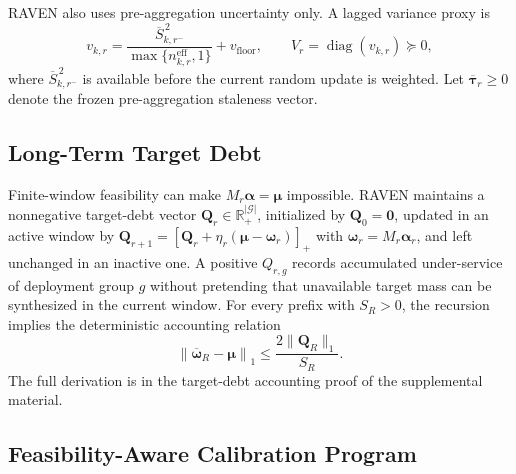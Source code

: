 \documentclass[letterpaper,journal]{IEEEtran}
\begin{document}
RAVEN also uses pre-aggregation uncertainty only.  A lagged variance proxy is
\begin{equation}
 v_{k,r}
 =
 \frac{
 \overline S_{k,r^-}^{\,2}
 }{
 \max\{n^{\mathrm{eff}}_{k,r},1\}
 }
 +
 v_{\mathrm{floor}},
 \qquad
 V_r=\operatorname{diag}(v_{k,r})\succeq0,
 \label{eq:variance_proxy}
\end{equation}
where $\overline S_{k,r^-}^{\,2}$ is available before the current random update
is weighted.  Let $\overline{\boldsymbol\tau}_r\ge0$ denote the frozen
pre-aggregation staleness vector.

\subsection{Long-Term Target Debt}
\label{subsec:debt}

Finite-window feasibility can make
$M_r\boldsymbol\alpha=\boldsymbol\mu$ impossible.  RAVEN maintains a
nonnegative target-debt vector
$\mathbf{Q}_r\in\mathbb{R}^{|\mathcal{G}|}_+$, initialized by
$\mathbf{Q}_0=\mathbf{0}$, updated in an active window by
$\mathbf{Q}_{r+1}=\left[\mathbf{Q}_r+\eta_r(\boldsymbol\mu-\boldsymbol\omega_r)\right]_+$
with $\boldsymbol\omega_r=M_r\boldsymbol\alpha_r$, and left unchanged in an
inactive one.  A positive $Q_{r,g}$ records accumulated under-service of
deployment group $g$ without pretending that unavailable target mass can be
synthesized in the current window.  For every prefix with $S_R>0$, the recursion
implies the deterministic accounting relation
\begin{equation}
 \left\|
 \overline{\boldsymbol\omega}_R-\boldsymbol\mu
 \right\|_1
 \le
 \frac{
 2\|\mathbf{Q}_R\|_1
 }{S_R}.
 \label{eq:debt_bound}
\end{equation}
The full derivation is in the target-debt accounting proof of the supplemental
material.

\subsection{Feasibility-Aware Calibration Program}
\label{subsec:P2}
\end{document}
